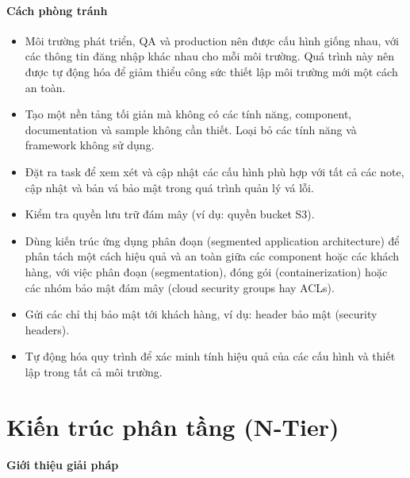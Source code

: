 \paragraph{Cách phòng tránh}

\begin{itemize}
    \item Môi trường phát triển, QA và production nên được cấu hình giống nhau, với các thông tin đăng nhập khác nhau cho mỗi môi trường. Quá trình này nên được tự động hóa để giảm thiểu công sức thiết lập môi trường mới một cách an toàn.
    \item Tạo một nền tảng tối giản mà không có các tính năng, component, documentation và sample không cần thiết. Loại bỏ các tính năng và framework không sử dụng.
    \item Đặt ra task để xem xét và cập nhật các cấu hình phù hợp với tất cả các note, cập nhật và bản vá bảo mật trong quá trình quản lý vá lỗi.
    \item Kiểm tra quyền lưu trữ đám mây (ví dụ: quyền bucket S3).
    \item Dùng kiến trúc ứng dụng phân đoạn (segmented application architecture) để phân tách một cách hiệu quả và an toàn giữa các component hoặc các khách hàng, với việc phân đoạn (segmentation), đóng gói (containerization) hoặc các nhóm bảo mật đám mây (cloud security groups  hay ACLs).
    \item Gửi các chỉ thị bảo mật tới khách hàng, ví dụ: header bảo mật (security headers).
    \item Tự động hóa quy trình để xác minh tính hiệu quả của các cấu hình và thiết lập trong tất cả môi trường.
\end{itemize}

\section{Kiến trúc phân tầng (N-Tier)} \label{sec:NTier}

\paragraph{Giới thiệu giải pháp ~\cite{chap2bib26} ~\cite{chap2bib27}}

